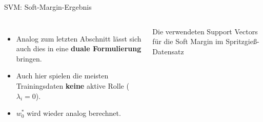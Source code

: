 \begin{frame}{SVM: Soft-Margin-Ergebnis}
\begin{columns}
\begin{itemize}
  \item Analog zum letzten Abschnitt lässt sich auch dies in eine
        \textbf{duale Formulierung} bringen.
  \item Auch hier spielen die meisten Trainingsdaten \textbf{keine} aktive
        Rolle ($\lambda_i = 0$).
  \item $w_0^{*}$ wird wieder analog berechnet.
\end{itemize}

\begin{center}

\footnotesize
 Die verwendeten Support Vectors für die Soft Margin im Spritzgieß-Datensatz
\end{center}

\end{columns}

\end{frame}

\makequizpage{\QUIZURL}{\QUIZQRCODE}{\QUIZIMAGE}
\makequestionspage{\FRAGENIMAGE}

